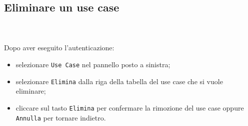 	\subsection{Eliminare un use case} \mbox{}\\ \mbox{}\\
	Dopo aver eseguito l'autenticazione:
	\begin{itemize}
		\item selezionare \texttt{Use Case} nel pannello posto a sinistra;
		\item selezionare \texttt{Elimina} dalla riga della tabella del use 
		case 
		che si vuole eliminare;\
		\item cliccare sul tasto \texttt{Elimina} per confermare la rimozione 
		del use case
		oppure \texttt{Annulla} per tornare indietro.
	\end{itemize}